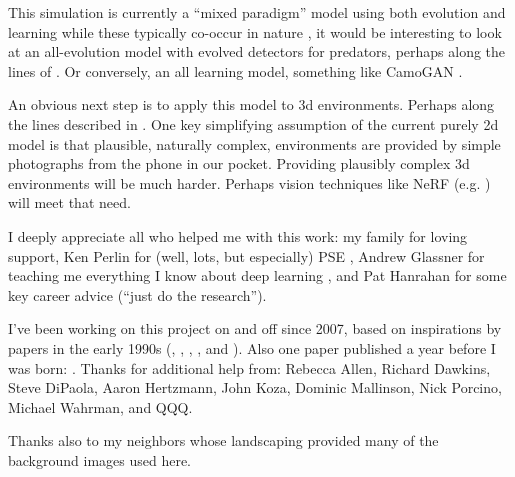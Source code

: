 \documentclass[acmtog]{acmart}
\begin{document}
\par
This simulation is currently a “mixed paradigm” model using both evolution and learning while these typically co-occur in nature \cite{valiant_probably_2013}, it would be interesting to look at an all-evolution model with evolved detectors for predators, perhaps along the lines of \citet{bi_genetic_2022}. Or conversely, an all learning model, something like CamoGAN \cite{talas_camogan_2020}.
\par
An obvious next step is to apply this model to 3d environments. Perhaps along the lines described in \citet{miller_color_2022}. One key simplifying assumption of the current purely 2d model is that plausible, naturally complex, environments are provided by simple photographs from the phone in our pocket. Providing plausibly complex 3d environments will be much harder. Perhaps vision techniques like NeRF (e.g. \cite{gao_nerf_2022}) will meet that need.
\par


\begin{acks}
I deeply appreciate all who helped me with this work: my family for loving support, Ken Perlin for (well, lots, but especially) PSE \cite{perlin_image_1985}, Andrew Glassner for teaching me everything I know about deep learning \cite{glassner_deep_2021}, and Pat Hanrahan for some key career advice (“just do the research”).
\par
I've been working on this project on and off since 2007, based on inspirations by papers in the early 1990s (\citet{witkin_reaction_1991}, \citet{turk_generating_1991}, \citet{angeline_competitive_1993}, \citet{sims_artificial_1991}, and \citet{sims_evolving_1994}). Also one paper published a year before I was born: \citet{turing_chemical_1952}.
Thanks for additional help from:
Rebecca Allen,
Richard Dawkins,
Steve DiPaola,
Aaron Hertzmann,
John Koza,
Dominic Mallinson,
Nick Porcino,
Michael Wahrman, 
and
QQQ.
\par
Thanks also to my neighbors whose landscaping provided many of the background images used here.
\par
\end{acks}




\end{document}
